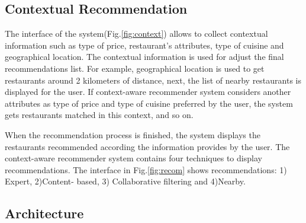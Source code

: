 \begin{figure*}
\captionsetup{justification=centering,margin=2cm}
\centering
{}
\caption{Fuzzy Inference System of expert.}
\label{fig:expertfis}     
\end{figure*}

\subsection{Contextual Recommendation} \label{sec:3.4} 

The interface of the system(Fig.\ref{fig:context})  allows to collect
contextual information such as type of price, restaurant's attributes,
type of cuisine and geographical location. The contextual information
is used for adjust the final recommendations list. For example, geographical location is used to get
restaurants around 2 kilometers of distance, next, the list of nearby
restaurants is displayed for the user. If context-aware recommender system
considers another attributes as type of price and type of cuisine preferred by
the user, the system gets restaurants matched in this context, and so on.

\begin{figure*}
\captionsetup{justification=centering,margin=2cm}
\centering
{}
\caption{System interface to collect contextual information.}
\label{fig:context}     
\end{figure*}


When the recommendation process is finished, the system displays the restaurants
recommended according the information provides by the user. The context-aware
recommender system contains four techniques to display recommendations. The
interface in Fig.\ref{fig:recom} shows recommendations: 1) Expert, 2)Content-
based, 3) Collaborative filtering and 4)Nearby.

\begin{figure*}
\captionsetup{justification=centering,margin=2cm}
\centering
{}
\caption{System inferface of recommendations section.}
\label{fig:recom}       
\end{figure*}

\subsection{Architecture} \label{sec:3.5}

